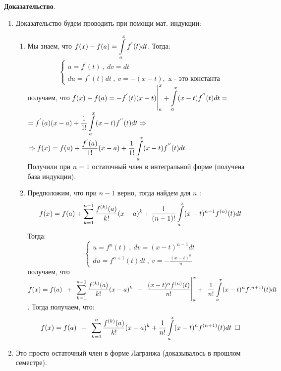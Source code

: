 \documentclass[a4paper,12pt]{article} %
\begin{document}
\textbf{Доказательство}. 
\begin{enumerate}
	\item Доказательство будем проводить при помощи мат. индукции:
	\begin{enumerate}
		\item Мы знаем, что $\Large \displaystyle f(x) - f(a) = \int\limits_{a}^{x} f^{'}(t)dt$. Тогда:
		\begin{equation*}
		\begin{cases}
  		u = f^{'}(t)\ ,\ dv = dt\\
  		du = f^{''}(t)dt\ ,\ v = -(x-t), \text{ x - это константа}
 		\end{cases}
		\end{equation*}
		получаем, что $\Large \displaystyle f(x) - f(a) = -f^{'}(t)(x-t) \bigg|_a^x + \int\limits_a^x (x-t) f^{''}(t)dt = $\\
		$\Large \displaystyle = f^{'}(a)(x-a) + \frac{1}{1!} \int\limits_a^x (x-t) f^{''}(t)dt \Rightarrow$\\
		 $\Rightarrow \Large \displaystyle  f(x) = f(a) + \frac{f^{'}(a)}{1!}(x-a) + \frac{1}{1!} \int\limits_a^x (x-t) f^{''}(t)dt$.\\
	Получили при $n = 1$ остаточный член в интегральной форме (получена база индукции).
		\item Предположим, что при $n - 1$ верно, тогда найдем для $n$ :
		\begin{equation*}
			\Large \displaystyle f(x) = f(a) + \sum\limits_{k = 1}^{n - 1} \frac{f^{(k)}(a)}{k!}(x-a)^k + \frac{1}{(n-1)!}\int\limits_a^x (x-t)^{n - 1} f^{(n)}(t)dt
		\end{equation*}
		Тогда:
		\begin{equation*}
		\begin{cases}
  		u = f^{n}(t)\ ,\ dv = (x-t)^{n-1}dt\\
  		du = f^{n + 1}(t)dt\ ,\ v = -\frac{(x-t)^n}{n}
 		\end{cases}
		\end{equation*}
		получаем, что $\Large \displaystyle f(x) = f(a)\ +\ \sum\limits_{k = 1}^{n - 1} \frac{f^{(k)}(a)}{k!}(x-a)^k\ -\ \frac{(x-t)^n f^{(n)}(t)}{n!} \bigg|_a^x +\ \frac{1}{n!} \int\limits_a^x (x-t)^n f^{(n+1)}(t)dt$. Тогда получаем, что:
	\begin{equation*}
		\Large \displaystyle f(x) = f(a)\ +\ \sum\limits_{k = 1}^{n} \frac{f^{(k)}(a)}{k!}(x-a)^k + \frac{1}{n!} \int\limits_a^x (x-t)^n f^{(n+1)}(t)dt \ \square
	\end{equation*}
		 
	\end{enumerate}

	\item Это просто остаточный член в форме Лагранжа (доказывалось в прошлом семестре).
\end{enumerate}
\end{document}
